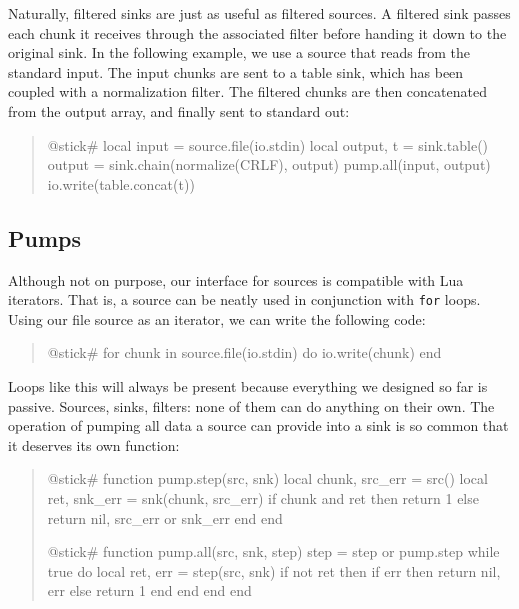 \documentclass[10pt]{article}
\begin{document}
			Naturally, filtered sinks are just as useful as filtered
			sources. A filtered sink passes each chunk it receives
			through the associated filter before handing it down to the
			original sink.  In the following example, we use a source
			that reads from the standard input.  The input chunks are
			sent to a table sink, which has been coupled with a
			normalization filter.  The filtered chunks are then
			concatenated from the output array, and finally sent to
			standard out:
			\begin{quote}
			\begin{lua}
			@stick#
			local input = source.file(io.stdin)
			local output, t = sink.table()
			output = sink.chain(normalize(CRLF), output)
			pump.all(input, output)
			io.write(table.concat(t))
			\end{lua}
			\end{quote}
			
			\subsection{Pumps}
			
			Although not on purpose, our interface for sources is
			compatible with Lua iterators. That is, a source can be
			neatly used in conjunction with \texttt{for} loops.  Using
			our file source as an iterator, we can write the following
			code:
			\begin{quote}
			\begin{lua}
			@stick#
			for chunk in source.file(io.stdin) do
            io.write(chunk)
			end
			\end{lua}
			\end{quote}
			
			Loops like this will always be present because everything 
			we designed so far is passive. Sources, sinks, filters: none
			of them can do anything on their own. The operation of
			pumping all data a source can provide into a sink is so
			common that it deserves its own function:
			\begin{quote}
			\begin{lua}
			@stick#
			function pump.step(src, snk)
            local chunk, src_err = src()
            local ret, snk_err = snk(chunk, src_err)
            if chunk and ret then return 1
            else return nil, src_err or snk_err end
			end
			
			@stick#
			function pump.all(src, snk, step)
        step = step or pump.step
        while true do
    local ret, err = step(src, snk)
    if not ret then
if err then return nil, err
else return 1 end
    end 
        end
			end
			\end{lua}
			\end{quote}
			
\end{document}
